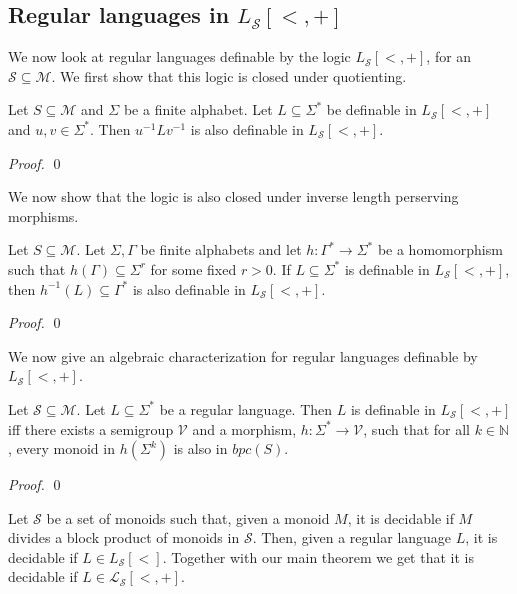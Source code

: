 \documentclass[envcountsame]{llncs}
\newcommand{\Nat}{\mathbb{N}}
\begin{document}
\subsection{Regular languages in $L_{\mathcal S}[<,+]$}
We now look at regular languages definable by the logic $L_{\mathcal{S}}[<,+]$, for an $\mathcal{S \subseteq M}$. We first show that this logic is closed under quotienting.

\begin{lemma} \label{lem_qnt}
Let $S \subseteq \mathcal{M}$ and $\Sigma$ be a finite alphabet. Let $L \subseteq \Sigma^*$ be definable in $L_{\mathcal{S}}[<,+]$ and $u, v \in \Sigma^*$. Then $u^{-1}Lv^{-1}$ is also definable in $L_{\mathcal{S}}[<,+]$.
\end{lemma}
\begin{proof}
\qed \end{proof}

We now show that the logic is also closed under inverse length perserving morphisms.
\begin{lemma} \label{lem_morph}
Let $S \subseteq \mathcal{M}$. Let $\Sigma,\Gamma$ be finite alphabets and let $h:\Gamma^* \rightarrow \Sigma^*$ be a homomorphism such that $h(\Gamma) \subseteq \Sigma^r$ for some fixed $r>0$. If $L \subseteq \Sigma^*$ is definable in $L_{\mathcal{S}}[<,+]$, then $h^{-1}(L) \subseteq \Gamma^*$ is also definable in $L_{\mathcal{S}}[<,+]$.
\end{lemma}
\begin{proof}
\qed \end{proof}

We now give an algebraic characterization for regular languages definable by $L_{\mathcal S}[<,+]$. 
\begin{theorem}
Let $\mathcal{S \subseteq M}$. Let $L \subseteq \Sigma^*$ be a regular language. Then $L$ is definable in $L_{\mathcal{S}}[<,+]$ iff there exists a semigroup $\mathcal{V}$ and a morphism, $h: \Sigma^* \rightarrow \mathcal{V}$, such that for all $k \in \Nat$, every monoid in $h(\Sigma^k)$ is also in $bpc(S)$.
\end{theorem}
\begin{proof}

\qed \end{proof}


Let $\mathcal{S}$ be a set of monoids such that, given a monoid $M$, it is decidable if $M$ divides a block product of monoids in $\mathcal{S}$. 
Then, given a regular language $L$, it is decidable if $L \in L_{\mathcal{S}}[<]$.
Together with our main theorem we get that it is decidable if $L\in\mathcal{L_{S}}[<,+]$.
\end{document}
